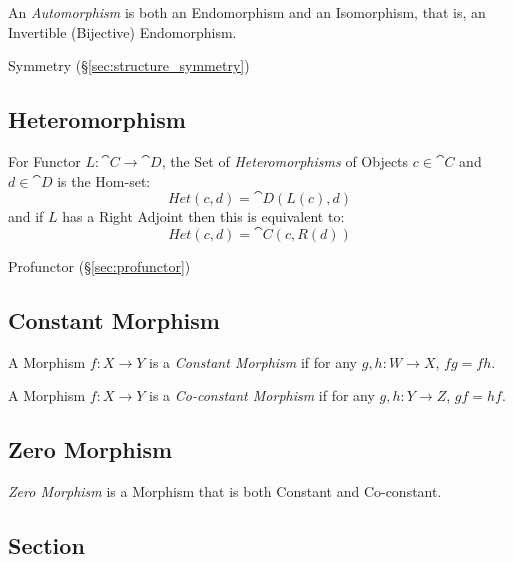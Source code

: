 An \emph{Automorphism} is both an Endomorphism and an Isomorphism,
that is, an Invertible (Bijective) Endomorphism.

Symmetry (\S\ref{sec:structure_symmetry})



\subsection{Heteromorphism}\label{sec:heteromorphism}

For Functor $L : \cat{C} \rightarrow \cat{D}$, the Set of
\emph{Heteromorphisms} of Objects $c \in \cat{C}$ and $d \in
\cat{D}$ is the Hom-set:
\[
  Het(c,d) = \cat{D}(L(c), d)
\]
and if $L$ has a Right Adjoint then this is equivalent to:
\[
  Het(c,d) = \cat{C}(c, R(d))
\]

Profunctor (\S\ref{sec:profunctor})



\subsection{Constant Morphism}\label{sec:constant_morphism}

A Morphism $f : X \rightarrow Y$ is a \emph{Constant Morphism} if for
any $g, h : W \rightarrow X$, $fg = fh$.

A Morphism $f : X \rightarrow Y$ is a \emph{Co-constant Morphism} if
for any $g, h : Y \rightarrow Z$, $gf = hf$.



\subsection{Zero Morphism}\label{sec:zero_morphism}

\emph{Zero Morphism} is a Morphism that is both Constant and
Co-constant.



\subsection{Section}\label{sec:section}

